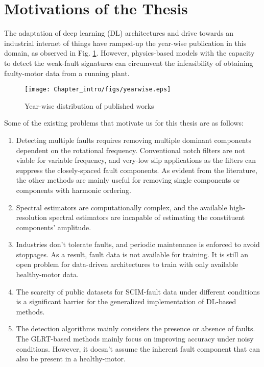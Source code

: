 \section{Motivations of the Thesis}
The adaptation of deep learning (DL) architectures and drive towards an industrial internet of things have ramped-up the year-wise publication in this domain, as observed in Fig. \ref{fig:yearwise}. However, physics-based models with the capacity to detect the weak-fault signatures can circumvent the infeasibility of obtaining faulty-motor data from a running plant. 
\begin{figure}[h] \centering
	{\texttt{[image: Chapter\_intro/figs/yearwise.eps]}} \caption{Year-wise distribution of published works} \label{fig:yearwise}
\end{figure}
Some of the existing problems that motivate us for this thesis are as follows:
\begin{enumerate}
	\renewcommand{\theenumi}{\roman{enumi}}
	\item Detecting multiple faults requires removing multiple dominant components dependent on the rotational frequency. Conventional notch filters are not viable for variable frequency, and very-low slip applications as the filters can suppress the closely-spaced fault components. As evident from the literature, the other methods are mainly useful for removing single components or components with harmonic ordering.
	\item Spectral estimators are computationally complex, and the available high-resolution spectral estimators are incapable of estimating the constituent components' amplitude.
	\item Industries don’t tolerate faults, and periodic maintenance is enforced to avoid stoppages. As a result, fault data is not available for training. It is still an open problem for data-driven architectures to train with only available healthy-motor data. 
	\item The scarcity of public datasets for SCIM-fault data under different conditions is a significant barrier for the generalized implementation of DL-based methods. 
	\item The detection algorithms mainly considers the presence or absence of faults. The GLRT-based methods mainly focus on improving accuracy under noisy conditions. However, it doesn’t assume the inherent fault component that can also be present in a healthy-motor.     
\end{enumerate}
